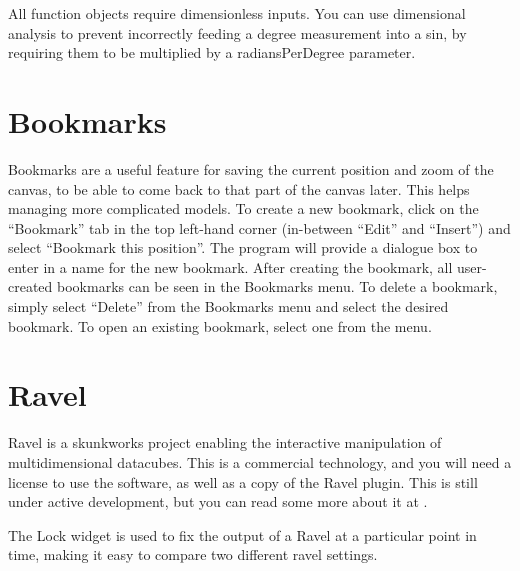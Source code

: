 All function objects require dimensionless inputs. You can use dimensional 
analysis to prevent incorrectly feeding a degree measurement into a sin, by 
requiring them to be multiplied by a radiansPerDegree parameter.

\section{Bookmarks}

Bookmarks are a useful feature for saving the current position and
zoom of the canvas, to be able to come back to that part of the canvas
later. This helps managing more complicated models.  To create a new
bookmark, click on the ``Bookmark'' tab in the top left-hand corner
(in-between ``Edit'' and ``Insert'') and select ``Bookmark this
position''. The program will provide a dialogue box to enter in a name
for the new bookmark. After creating the bookmark, all user-created
bookmarks can be seen in the Bookmarks menu. To delete a bookmark,
simply select ``Delete'' from the Bookmarks menu and select the
desired bookmark. To open an existing bookmark, select one from the
menu.

\section{Ravel}\label{Ravel}\label{Lock}

Ravel is a skunkworks project enabling the interactive manipulation of
multidimensional datacubes. This is a commercial technology, and you
will need a license to use the software, as well as a copy of the
Ravel plugin. This is still under active development, but you can read
some more about it at .

The Lock widget is used to fix the output of a Ravel at a particular
point in time, making it easy to compare two different ravel settings.
